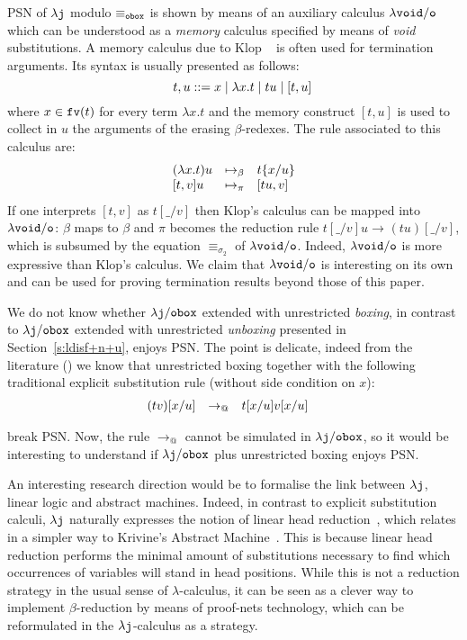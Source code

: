\documentclass{LMCS}
\newcommand{\sep}{\hspace*{0.5cm}}
\renewcommand{\>}{\rightarrow}
\def\lam{\lambda}
\def\sig{\sigma}
\newcommand{\Rew}[1]{\rightarrow_{#1}}
\newcommand{\rRew}[1]{\mapsto_{#1}}
\newcommand{\isubs}[1]{ \{ #1  \} }
\newcommand{\dis}{{\tt j}}
\newcommand{\ldis}{\lam{\dis}}
\newcommand{\fv}[1]{{\tt fv}(#1)}
\newcommand{\Beta}{{\tt \beta}}
\newcommand{\modulo}[2]{#1/#2}
\newcommand{\eqw}[1]{\equiv_{#1}}
\newcommand{\ldisf}{\lam \modulo{\dis}{\fsymb}}
\newcommand{\fsymb}{\osymb\boite}
\newcommand{\osymb}{{\tt o}}
\newcommand{\eqf}{\eqw{\fsymb}}
\newcommand{\aux}{{\tt void}}
\newcommand{\lauxm}{\lam\modulo{ \aux }{ \osymb }}
\newcommand{\boite}{{\tt box}}
\newcommand{\void}{\_}
\begin{document}
PSN  of  $\ldis$ modulo  $\eqf$  is shown  by  means  of an  auxiliary
calculus  $\lauxm$  which  can  be  understood  as  a  \textit{memory}
calculus specified by  means of \textit{void} substitutions.  
A memory calculus due to Klop ~\cite{Klo} is often used for termination
arguments. Its syntax is usually presented as follows:
\[ \sep t, u :: = x \mid \lam x. t \mid t u \mid [t,u] \]
where $x \in \fv{t}$ for every term $\lam x.t$ and the memory construct $[t,u]$ 
is used to collect in $u$ the  arguments of the erasing $\beta$-redexes. The rule associated to this calculus are:
\[\begin{array}{lll}
(\lam x.t) u   & \rRew{\Beta}&  t\isubs{x/u}    \\
{[}t,v{]} u & \rRew{\pi}&  {[}t u, v{]} \\   
\end{array}\]
If       one      interprets       $[t,v]$       as      $t[\void/v]$   then   Klop's
calculus  can be  mapped into  $\lauxm$: $\beta$  maps to  $\beta$ and
$\pi$         becomes        the         reduction        rule
$t[\void/v]  u\Rew{}(t  u)[\void/v]$,  which is  subsumed  by
the equation $\eqw{\sig_2}$ of $\lauxm$. 
Indeed, $\lauxm$ 
is more expressive than  Klop's calculus.  We
claim that  $\lauxm$ is  interesting on  its own and  can be  used for
proving termination results beyond those of this paper.

We do not know whether 
  $\ldisf$ extended with unrestricted \textit{boxing}, in contrast to
    $\ldisf$ extended with unrestricted \textit{unboxing} presented in 
  Section~\ref{s:ldisf+n+u}, enjoys PSN.  The
  point is delicate, indeed from the literature (\cite{Mellies1995a}) we know
  that unrestricted boxing together with the following
  traditional explicit substitution rule (without side condition on
  $x$):
\[\begin{array}{lll@{\hspace{.5cm}}l}
  (t v) [x/u]&\Rew{@}& t [x/u] v [x/u]
\end{array}\]

\noindent break PSN. Now, the rule $\Rew{@}$ cannot be simulated in
$\ldisf$, so it would be interesting to
 understand if $\ldisf$ plus unrestricted boxing
enjoys PSN. 

An  interesting research  direction  would be  to  formalise the  link
between  $\ldis$,  linear  logic  and abstract  machines.  Indeed,  in
contrast  to  explicit substitution  calculi,  $\ldis$
naturally     expresses     the      notion     of     linear     head
reduction~\cite{Danos99opt},  which  relates   in  a  simpler  way  to
Krivine's  Abstract  Machine~\cite{Krivinemachine}. This
is  because  linear head  reduction  performs  the  minimal amount  of
substitutions necessary  to find  which occurrences of  variables will
stand in head positions. While this is not a reduction strategy in the
usual  sense of  $\lam$-calculus, it  can  be seen  as a  clever way  to
implement $\beta$-reduction  by means of  proof-nets technology, which
can be reformulated in the $\ldis$-calculus as a strategy.
\end{document}
